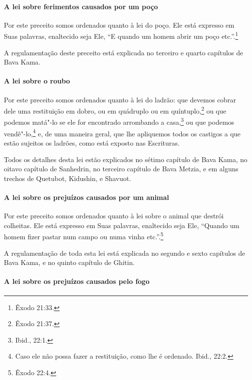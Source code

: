 \begin{multicols}{2}
\paragraph{A lei sobre ferimentos causados por um poço}

Por este preceito somos ordenados quanto à lei do poço. Ele está
expresso em Suas palavras, enaltecido seja Ele, ``E quando um homem
abrir um poço etc.''.\footnote{Êxodo 21:33.}

A regulamentação deste preceito está explicada no terceiro e quarto
capítulos de Bava Kama\starr.


\paragraph{A lei sobre o roubo}

Por este preceito somos ordenados quanto à lei do ladrão: que devemos
cobrar dele uma restituição em dobro, ou em quádruplo ou em
quíntuplo,\footnote{Êxodo 21:37.} ou que podemos matá"-lo se ele for
encontrado arrombando a casa,\footnote{Ibid., 22:1.} ou que podemos
vendê"-lo,\footnote{Caso ele não possa fazer a restituição, como lhe é ordenado. Ibid.,
  22:2.} e, de uma maneira geral, que lhe
apliquemos todos os castigos a que estão sujeitos os ladrões, como está
exposto nas Escrituras.

Todos os detalhes desta lei estão explicados no sétimo capítulo de Bava
Kama\starr, no oitavo capítulo de Sanhedrin\starr, no terceiro capítulo de Bava
Metzia\starr, e em alguns trechos de Quetubot\starr, Kidushin\starr, e Shavuot\starr.

\paragraph{A lei sobre os prejuízos causados por um animal}

Por este preceito somos ordenados quanto à lei sobre o animal que
destrói colheitas. Ele está expresso em Suas palavras, enaltecido seja
Ele, ``Quando um homem fizer pastar num campo ou numa vinha etc.''.\footnote{Êxodo 22:4.}

A regulamentação de toda esta lei está explicada no segundo e sexto
capítulos de Bava Kama\starr, e no quinto capítulo de Ghitin.


\paragraph{A lei sobre os prejuízos causados pelo fogo}


\end{multicols}
